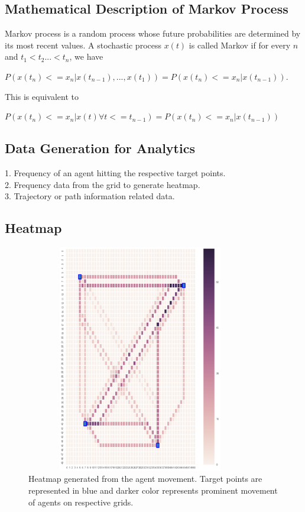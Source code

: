 \documentclass[11pt]{report}
\begin{document}
\subsection{Mathematical Description of Markov Process}
Markov process is a  random process whose future probabilities are determined by its most recent values. A stochastic process $x(t)$ is called Markov if for every $n$ and $t_1<t_2...<t_n$, we have \\
\begin{center}
$ P(x(t_n)<=x_n|x(t_{n-1}),...,x(t_1)) = P(x(t_n)<=x_n|x(t_{n-1})) $.
\end{center}
This is equivalent to \\
\begin{center}
$ P(x(t_n)<=x_n|x(t) \forall t<=t_{n-1}) = P(x(t_n)<=x_n|x(t_{n-1})) $
\end{center}
 

\subsection{Data Generation for Analytics}
1. Frequency of an agent hitting the respective target points.\\
2. Frequency data from the grid to generate heatmap.\\
3. Trajectory or path information related data.
\subsection{Heatmap}

\begin{figure}[h!]
  \centering
  \includegraphics[height = 10cm, width = 10cm]{heatmap_2.png}
  \caption{Heatmap generated from the agent movement. Target points are represented in blue and darker color represents prominent movement of agents on respective grids.}
  \label{fig:heatmap_2}
\end{figure}
\end{document}
